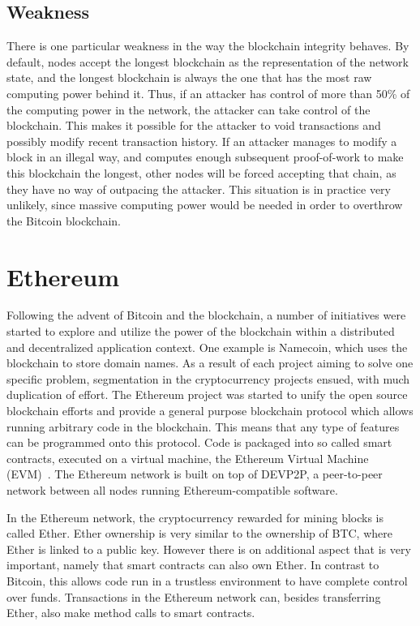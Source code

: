 \subsection{Weakness}
There is one particular weakness in the way the blockchain integrity behaves. By default, nodes accept the longest blockchain as the representation of the network state, and the longest blockchain is always the one that has the most raw computing power behind it. Thus, if an attacker has control of more than 50\% of the computing power in the network, the attacker can take control of the blockchain. This makes it possible for the attacker to void transactions and possibly modify recent transaction history. If an attacker manages to modify a block in an illegal way, and computes enough subsequent proof-of-work to make this blockchain the longest, other nodes will be forced accepting that chain, as they have no way of outpacing the attacker. This situation is in practice very unlikely, since massive computing power would be needed in order to overthrow the Bitcoin blockchain.

\section{Ethereum}
Following the advent of Bitcoin and the blockchain, a number of initiatives were started to explore and utilize the power of the blockchain within a distributed and decentralized application context. One example is Namecoin, which uses the blockchain to store domain names. As a result of each project aiming to solve one specific problem, segmentation in the cryptocurrency projects ensued, with much duplication of effort. The Ethereum project was started to unify the open source blockchain efforts and provide a general purpose blockchain protocol which allows running arbitrary code in the blockchain. This means that any type of features can be programmed onto this protocol. Code is packaged into so called smart contracts, executed on a virtual machine, the Ethereum Virtual Machine (EVM)~\cite{ethereum:white}. The Ethereum network is built on top of DEVP2P, a peer-to-peer network between all nodes running Ethereum-compatible software.

In the Ethereum network, the cryptocurrency rewarded for mining blocks is called Ether. Ether ownership is very similar to the ownership of BTC, where Ether is linked to a public key. However there is on additional aspect that is very important, namely that smart contracts can also own Ether. In contrast to Bitcoin, this allows code run in a trustless environment to have complete control over funds. Transactions in the Ethereum network can, besides transferring Ether, also make method calls to smart contracts.

